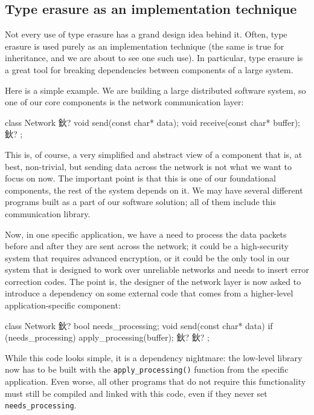 \subsection{Type erasure as an implementation technique}

Not every use of type erasure has a grand design idea behind it. Often, type erasure is used purely as an implementation technique (the same is true for inheritance, and we are about to see one such use). In particular, type erasure is a great tool for breaking dependencies between components of a large system.

Here is a simple example. We are building a large distributed software system, so one of our core components is the network communication layer:

\begin{code}
class Network {
  鈥?
  void send(const char* data);
  void receive(const char* buffer);
  鈥?
};
\end{code}

This is, of course, a very simplified and abstract view of a component that is, at best, non-trivial, but sending data across the network is not what we want to focus on now. The important point is that this is one of our foundational components, the rest of the system depends on it. We may have several different programs built as a part of our software solution; all of them include this communication library.

Now, in one specific application, we have a need to process the data packets before and after they are sent across the network; it could be a high-security system that requires advanced encryption, or it could be the only tool in our system that is designed to work over unreliable networks and needs to insert error correction codes. The point is, the designer of the network layer is now asked to introduce a dependency on some external code that comes from a higher-level application-specific component:

\begin{code}
class Network {
  鈥?
  bool needs_processing;
  void send(const char* data) {
    if (needs_processing) apply_processing(buffer);
    鈥?
  }
  鈥?
};
\end{code}

While this code looks simple, it is a dependency nightmare: the low-level library now has to be built with the \texttt{apply\_processing()} function from the specific application. Even worse, all other programs that do not require this functionality must still be compiled and linked with this code, even if they never set \texttt{needs\_processing}.


